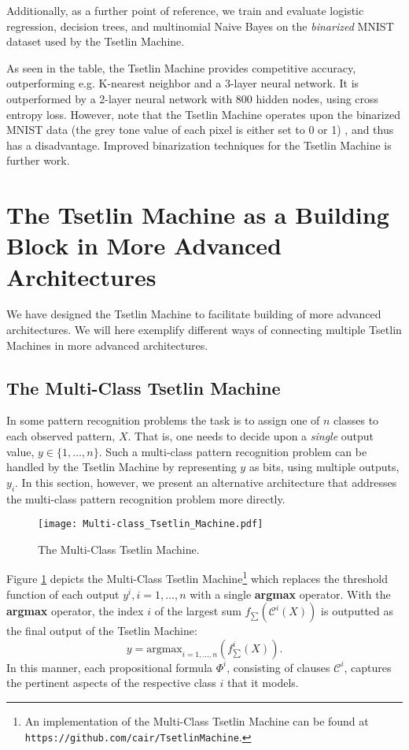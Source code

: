 \documentclass[11pt,a4paper]{article}
\begin{document}
Additionally, as a further point of reference, we train and evaluate logistic regression, decision trees, and multinomial Naive Bayes on the \emph{binarized} MNIST dataset used by the Tsetlin Machine.

As seen in the table, the Tsetlin Machine provides competitive accuracy, outperforming e.g. K-nearest neighbor and a 3-layer neural network. It is outperformed by a 2-layer neural network with 800 hidden nodes, using cross entropy loss. However, note that the Tsetlin Machine operates upon the binarized MNIST data (the grey tone value of each pixel is either set to 0 or 1) , and thus has a disadvantage. Improved binarization techniques for the Tsetlin Machine is further work.

\section{The Tsetlin Machine as a Building Block in More Advanced Architectures}
\label{sec:building_block}

We have designed the Tsetlin Machine to facilitate building of more advanced architectures. We will here exemplify different ways of connecting multiple Tsetlin Machines in more advanced architectures.

\subsection{The Multi-Class Tsetlin Machine}

In some pattern recognition problems the task is to assign one of $n$ classes to each observed pattern, $X$. That is, one needs to decide upon a \emph{single} output value, $y \in \{1, \ldots, n\}$. Such a multi-class pattern recognition problem can be handled by the Tsetlin Machine by representing $y$ as bits, using multiple outputs, $y_i$. In this section, however, we present an alternative architecture that addresses the multi-class pattern recognition problem more directly.

\begin{figure}[!th]
\centering
\texttt{[image: Multi-class\_Tsetlin\_Machine.pdf]}
\caption{The Multi-Class Tsetlin Machine.}
\label{figure:multi-class_tsetlin_machine}
\end{figure}

Figure \ref{figure:multi-class_tsetlin_machine} depicts the Multi-Class Tsetlin Machine\footnote{An implementation of the Multi-Class Tsetlin Machine can be found at {\tt https://github.com/cair/TsetlinMachine}.} which replaces the threshold function of each output $y^i, i=1, \ldots, n$ with a single {\bf argmax} operator. With the {\bf argmax} operator, the index $i$ of the largest sum $f_{\sum}(\mathcal{C}^i(X))$ is outputted as the final output of the Tsetlin Machine:
\begin{equation}
y = \mathrm{argmax}_{i=1,\ldots,n}(f^i_{\sum}(X)).
\end{equation}
In this manner, each propositional formula $\Phi^i$, consisting of clauses $\mathcal{C}^i$, captures the pertinent aspects of the respective class $i$ that it models. 
\end{document}
